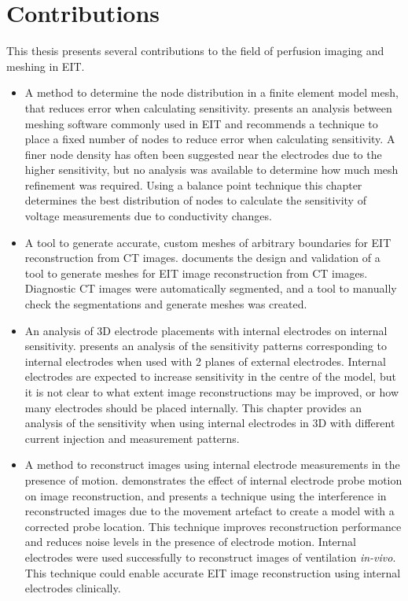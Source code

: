 \section{Contributions}
This thesis presents several contributions to the field of perfusion imaging and 
meshing in EIT.
\begin{itemize}
	\item A method to determine the node distribution in a finite element model mesh,
        that reduces error when calculating sensitivity.  presents an 
        analysis between meshing software commonly used in EIT and recommends a technique to 
        place a fixed number of nodes to reduce error when calculating sensitivity.
        A finer node density has often been suggested near the electrodes due to the higher 
        sensitivity, but no analysis was available to determine how much mesh refinement was required. 
        Using a balance point 
        technique this chapter determines the best distribution of nodes
        to calculate the sensitivity of voltage measurements due to conductivity changes.
	\item A tool to generate accurate, custom meshes of arbitrary boundaries for EIT reconstruction from 
        CT images.  documents 
        the design and validation of a tool to generate meshes for EIT image reconstruction from CT images. 
        Diagnostic CT images were automatically segmented, and a tool to manually check the segmentations
        and generate meshes was created. 
	\item An analysis of 3D electrode placements with internal electrodes on internal sensitivity. 
         presents an analysis of the sensitivity patterns corresponding to 
        internal electrodes when used with 2 planes of external electrodes. Internal electrodes are
        expected to increase sensitivity in the centre of the model, but it is not clear to what extent 
        image reconstructions may be improved, or how many electrodes should be 
        placed internally. This chapter provides an analysis of the sensitivity when using internal
        electrodes in 3D with different current injection and measurement patterns.  
	\item A method to reconstruct images using internal electrode measurements in the presence of motion.
         demonstrates the effect of internal electrode probe motion on image 
        reconstruction, and presents a technique using the interference in reconstructed images 
        due to the movement artefact to create a model with a corrected probe location. This technique
        improves reconstruction performance and reduces noise levels in the presence of electrode motion. 
        Internal electrodes were used successfully to reconstruct images of ventilation \emph{in-vivo}.
        This technique could enable accurate EIT image reconstruction using internal electrodes clinically.
\end{itemize}

